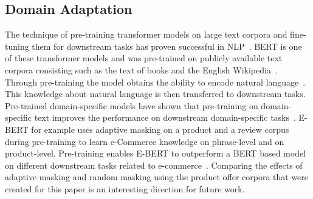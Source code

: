 \documentclass[11pt,dvipdfm]{article}
\begin{document}
\subsection{Domain Adaptation}
The technique of pre-training transformer models on large text corpora and fine-tuning them for downstream tasks has proven successful in \ac{NLP}~\cite{devlin_bert_2019,liu_roberta_2019,yang_xlnet_2020}.
BERT is one of these transformer models and was pre-trained on publicly available text corpora consisting such as the text of books and the English Wikipedia~\cite{devlin_bert_2019}.
Through pre-training the model obtains the ability to encode natural language~\cite{raffel_exploring_2020}.
This knowledge about natural language is then transferred to downstream tasks.
Pre-trained domain-specific models have shown that pre-training on domain-specific text improves the performance on downstream domain-specific tasks~\cite{lee_biobert_2019, zhang_e-bert_2020, beltagy_scibert_2019, gururangan_dont_2020}.
E-BERT for example uses adaptive masking on a product and a review corpus during pre-training to learn e-Commerce knowledge on phrase-level and on product-level.
Pre-training enables E-BERT to outperform a BERT based model on different downstream tasks related to e-commerce~\cite{zhang_e-bert_2020}.
Comparing the effects of adaptive masking and random masking using the product offer corpora that were created for this paper is an interesting direction for future work.
\end{document}
